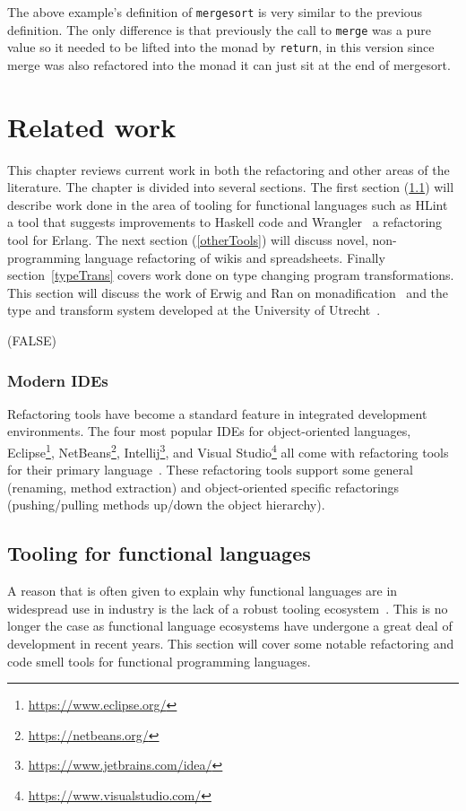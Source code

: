 The above example's definition of \texttt{mergesort} is very similar to the previous definition. The only difference is that previously the call to \texttt{merge} was a pure value so it needed to be lifted into the monad by \texttt{return}, in this version since merge was also refactored into the monad it can just sit at the end of mergesort.

\fi 


\chapter{Related work}

This chapter reviews current work in both the refactoring and other areas of the literature. The chapter is divided into several sections. The first section (\ref{funcTools}) will describe work done in the area of tooling for functional languages such as HLint~\citep{hlint} a tool that suggests improvements to Haskell code and Wrangler~\citep{wrangler} a refactoring tool for Erlang. The next section (\ref{otherTools}) will discuss novel, non-programming language refactoring of wikis and spreadsheets. Finally section~\ref{typeTrans} covers work done on type changing program transformations. This section will discuss the work of Erwig and Ran on monadification~\citep{monadification} and the type and transform system developed at the University of Utrecht~\citep{typeAndTransform}.

\if(FALSE)
\subsection{Modern IDEs}
Refactoring tools have become a standard feature in integrated development environments. The four most popular IDEs for object-oriented languages, Eclipse\footnote{\url{https://www.eclipse.org/}}, NetBeans\footnote{\url{https://netbeans.org/}}, Intellij\footnote{\url{https://www.jetbrains.com/idea/}}, and Visual Studio\footnote{\url{https://www.visualstudio.com/}} all come with refactoring tools for their primary language~\citep{ides}. These refactoring tools support some general (renaming, method extraction) and object-oriented specific refactorings (pushing/pulling methods up/down the object hierarchy).  
\fi

\section{Tooling for functional languages}\label{funcTools}
A reason that is often given to explain why functional languages are in widespread use in industry is the lack of a robust tooling ecosystem~\citep{wadlerTools}. This is no longer the case as functional language ecosystems have undergone a great deal of development in recent years. This section will cover some notable refactoring and code smell tools for functional programming languages.

